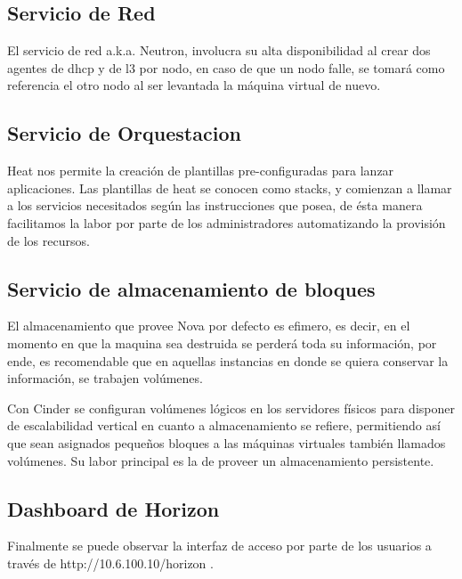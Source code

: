     \subsection{Servicio de Red}
    
    El servicio de red a.k.a. Neutron, involucra su alta disponibilidad al crear dos agentes de dhcp y de l3 por nodo, en caso de que un nodo falle, se tomará como referencia el otro nodo al ser levantada la máquina virtual de nuevo.
      
    \subsection{Servicio de Orquestacion}
     
     Heat nos permite la creación de plantillas pre-configuradas para lanzar aplicaciones. Las plantillas de heat se conocen como stacks, y comienzan a llamar a los servicios necesitados según las instrucciones que posea, de ésta manera facilitamos la labor por parte de los administradores automatizando la provisión de los recursos.
     
     
     
    \subsection{Servicio de almacenamiento de bloques}
    
    El almacenamiento que provee Nova por defecto es efimero, es decir, en el momento en que la maquina sea destruida se perderá toda su información, por ende, es recomendable que en aquellas instancias en donde se quiera conservar la información, se trabajen volúmenes.
    
    Con Cinder se configuran volúmenes lógicos en los servidores físicos para disponer de escalabilidad vertical en cuanto a almacenamiento se refiere, permitiendo así que sean asignados pequeños bloques a las máquinas virtuales también llamados volúmenes. Su labor principal es la de proveer un almacenamiento persistente.
    
    \subsection{Dashboard de Horizon}
    
    Finalmente se puede observar la interfaz de acceso por parte de los usuarios a través de http://10.6.100.10/horizon .
    
    
